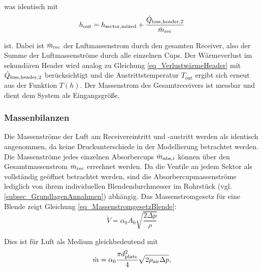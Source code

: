 \vspace*{-\baselineskip}was identisch mit
\begin{equation} \label{eq_Headerout2}
h_{\mathrm{out}} = h_{\mathrm{sector,mixed}} + \frac{\dot{Q}_{\mathrm{loss,header,2}}}{\dot{m}_{\mathrm{rec}}}
\end{equation}

\vspace*{-\baselineskip}ist.
Dabei ist $\dot{m}_{\mathrm{rec}}$ der Luftmassenstrom durch den gesamten Receiver, also der Summe der Luftmassenströme durch alle einzelnen Cups.
Der Wärmeverlust im sekundären Header wird analog zu Gleichung \ref{eq_VerlustwärmeHeader} mit $\dot{Q}_{\mathrm{loss,header,2}}$ berücksichtigt und die Austrittstemperatur $T_{\mathrm{out}}$ ergibt sich erneut aus der Funktion $T(h)$.
Der Massenstrom des Gesamtreceivers ist messbar und dient dem System als Eingangsgröße. \cite[S.92]{DissGall}


\subsubsection*{Massenbilanzen} \label{subsubsec_Massenbilanzen}
Die Massenströme der Luft am Receivereintritt und -austritt werden als identisch angenommen, da keine Druckunterschiede in der Modellierung betrachtet werden.
Die Massenströme jedes einzelnen Absorbercups $\dot{m}_{\mathrm{abs}, i}$ können über den Gesamtmassenstrom $\dot{m}_{\mathrm{rec}}$ errechnet werden.
Da die Ventile an jedem Sektor als vollständig geöffnet betrachtet werden, sind die Absorbercupmassenströme lediglich von ihrem individuellen Blendendurchmesser im Rohrstück (vgl. \ref{subsec_GrundlagenAnnahmen}) abhängig.
Das Massenstromgesetz für eine Blende zeigt Gleichung \ref{eq_MassenstromgesetzBlende}:
\begin{equation} \label{eq_MassenstromgesetzBlende}
    \dot{V}=\alpha_0 A_0 \sqrt{\frac{2 \Delta p}{\rho}}
\end{equation}

Dies ist für Luft als Medium gleichbedeutend mit
\begin{equation} \label{eq_MassenstromBlende}
\dot{m} = \alpha_0 \frac{\pi d_{\mathrm{plate} }^2}{4} \sqrt{2 \rho_{\mathrm{air}} \Delta p },
\end{equation}

